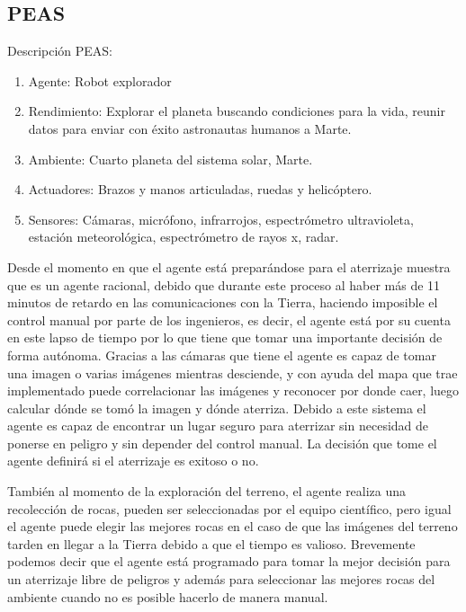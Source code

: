 \documentclass{article}
\begin{document}
        \subsection{PEAS}
            Descripción PEAS:
            \begin{enumerate}
                \item Agente: Robot explorador
                \item Rendimiento: Explorar el planeta buscando condiciones para la vida, reunir datos para enviar con éxito astronautas humanos a Marte.
                \item Ambiente: Cuarto planeta del sistema solar, Marte.
                \item Actuadores: Brazos y manos articuladas, ruedas y helicóptero.
                \item Sensores: Cámaras, micrófono, infrarrojos, espectrómetro ultravioleta, estación meteorológica, espectrómetro de rayos x, radar. 
            \end{enumerate}
            
            Desde el momento en que el agente está preparándose para el aterrizaje muestra que es un agente racional, debido que durante este proceso al haber más de 11 minutos de retardo en las comunicaciones con la Tierra, haciendo imposible el control manual por parte de los ingenieros, es decir, el agente está por su cuenta en este lapso de tiempo por lo que tiene que tomar una importante decisión de forma autónoma. Gracias a las cámaras que tiene el agente es capaz de tomar una imagen o varias imágenes mientras desciende, y con ayuda del mapa que trae implementado puede correlacionar las imágenes y reconocer por donde caer, luego calcular dónde se tomó la imagen y dónde aterriza. Debido a este sistema el agente es capaz de encontrar un lugar seguro para aterrizar sin necesidad de ponerse en peligro y sin depender del control manual. La decisión que tome el agente definirá si el aterrizaje es exitoso o no.

            También al momento de la exploración del terreno, el agente realiza una recolección de rocas, pueden ser seleccionadas por el equipo científico, pero igual el agente puede elegir las mejores rocas en el caso de que las imágenes del terreno tarden en llegar a la Tierra debido a que el tiempo es valioso.
            Brevemente podemos decir que el agente está programado para tomar la mejor decisión para un aterrizaje libre de peligros y además para seleccionar las mejores rocas del ambiente cuando no es posible hacerlo de manera manual.
        
\end{document}

